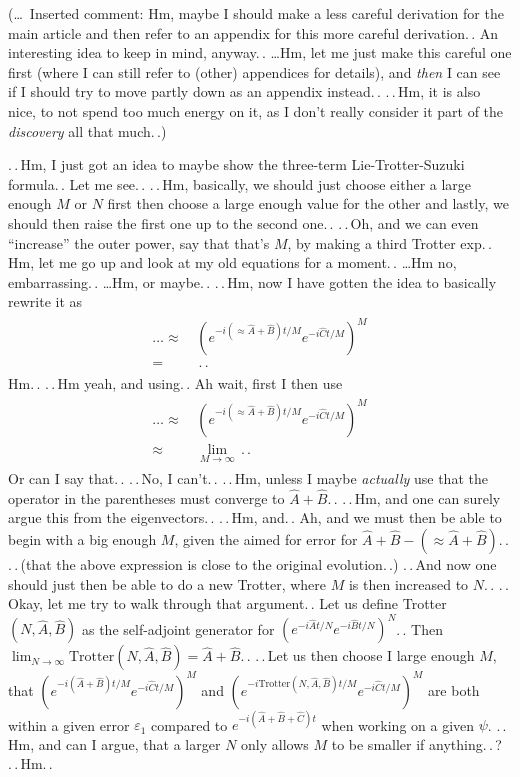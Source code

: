 \documentclass{report}
\begin{document}
(\ldots\ Inserted comment: Hm, maybe I should make a less careful derivation for the main article and then refer to an appendix for this more careful derivation.\,. An interesting idea to keep in mind, anyway.\,. \ldots Hm, let me just make this careful one first (where I can still refer to (other) appendices for details), and \emph{then} I can see if I should try to move partly down as an appendix instead.\,. .\,.\,Hm, it is also nice, to not spend too much energy on it, as I don't really consider it part of the \emph{discovery} all that much.\,.) %

.\,.\,Hm, I just got an idea to maybe show the three-term Lie-Trotter-Suzuki formula.\,. Let me see.\,. 
.\,.\,Hm, basically, we should just choose either a large enough $M$ or $N$ first then choose a large enough value for the other and lastly, we should then raise the first one up to the second one.\,. .\,.\,Oh, and we can even ``increase'' the outer power, say that that's $M$, by making a third Trotter exp.\,. Hm, let me go up and look at my old equations for a moment.\,. %
\ldots Hm no, embarrassing.\,. \ldots Hm, or maybe.\,. .\,.\,Hm, now I have gotten the idea to basically rewrite it as
\begin{align}
\begin{aligned}
	\ldots \approx&\, (e^{-i (\approx  \hat A + \hat B) t / M} e^{-i \hat C t / M} )^M
	\\=&\, 
	\,.\,.
\end{aligned}
\end{align}
Hm.\,. .\,.\,Hm yeah, and using.\,. Ah wait, first I then use
\begin{align}
\begin{aligned}
	\ldots \approx&\, (e^{-i (\approx  \hat A + \hat B) t / M} e^{-i \hat C t / M} )^M
	\\\approx&\, 
		\lim_{M\to \infty} \,.\,.
\end{aligned}
\end{align}
Or can I say that.\,. .\,.\,No, I can't.\,. .\,.\,Hm, unless I maybe \emph{actually} use that the operator in the parentheses must converge to $\hat A + \hat B$.\,. %
.\,.\,Hm, and one can surely argue this from the eigenvectors.\,. .\,.\,Hm, and.\,. Ah, and we must then be able to begin with a big enough $M$, given the aimed for error for $\hat A + \hat B - (\approx \hat A + \hat B)$.\,. .\,.\,(that the above expression is close to the original evolution.\,.) .\,.\,And now one should just then be able to do a new Trotter, where $M$ is then increased to $N$.\,. .\,.\,Okay, let me try to walk through that argument.\,. Let us define Trotter$(N, \hat A, \hat B)$ as the self-adjoint generator for $(e^{-i \hat A t / N} e^{-i \hat B t / N} )^N$.\,. Then $\lim_{N\to \infty} \mathrm{Trotter}(N, \hat A, \hat B) = \hat A + \hat B$.\,. .\,.\,Let us then choose I large enough $M$, that $(e^{-i (\hat A + \hat B) t / M} e^{-i \hat C t / M} )^M$ and $(e^{-i \mathrm{Trotter}(N, \hat A, \hat B) t / M} e^{-i \hat C t / M} )^M$ are both within a given error $\varepsilon_1$ compared to $e^{-i (\hat A + \hat B + \hat C) t}$ when working on a given $\psi$. .\,.\,Hm, and can I argue, that a larger $N$ only allows $M$ to be smaller if anything.\,.\,? .\,.\,Hm.\,. %
\end{document}
